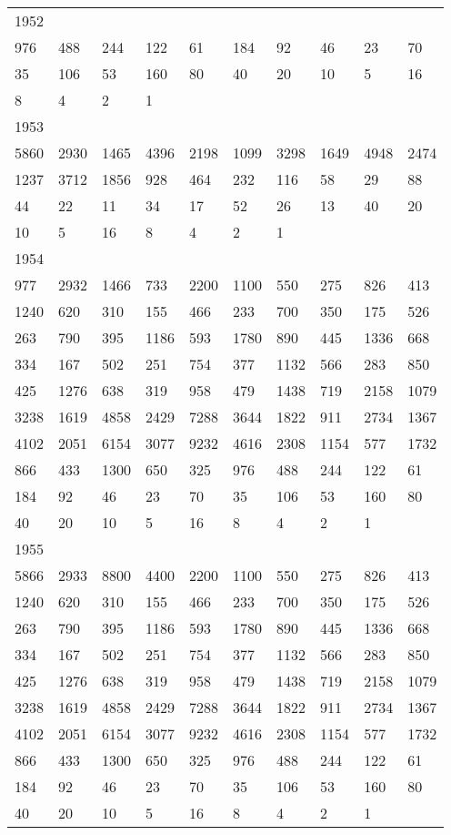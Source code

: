 \begin{longtable}{*{10}{l}}
1952&&&&&&&&&\\
976& 488& 244& 122& 61& 184& 92& 46& 23& 70\\
35& 106& 53& 160& 80& 40& 20& 10& 5& 16\\
8& 4& 2& 1& \\

1953&&&&&&&&&\\
5860& 2930& 1465& 4396& 2198& 1099& 3298& 1649& 4948& 2474\\
1237& 3712& 1856& 928& 464& 232& 116& 58& 29& 88\\
44& 22& 11& 34& 17& 52& 26& 13& 40& 20\\
10& 5& 16& 8& 4& 2& 1& \\

1954&&&&&&&&&\\
977& 2932& 1466& 733& 2200& 1100& 550& 275& 826& 413\\
1240& 620& 310& 155& 466& 233& 700& 350& 175& 526\\
263& 790& 395& 1186& 593& 1780& 890& 445& 1336& 668\\
334& 167& 502& 251& 754& 377& 1132& 566& 283& 850\\
425& 1276& 638& 319& 958& 479& 1438& 719& 2158& 1079\\
3238& 1619& 4858& 2429& 7288& 3644& 1822& 911& 2734& 1367\\
4102& 2051& 6154& 3077& 9232& 4616& 2308& 1154& 577& 1732\\
866& 433& 1300& 650& 325& 976& 488& 244& 122& 61\\
184& 92& 46& 23& 70& 35& 106& 53& 160& 80\\
40& 20& 10& 5& 16& 8& 4& 2& 1& \\

1955&&&&&&&&&\\
5866& 2933& 8800& 4400& 2200& 1100& 550& 275& 826& 413\\
1240& 620& 310& 155& 466& 233& 700& 350& 175& 526\\
263& 790& 395& 1186& 593& 1780& 890& 445& 1336& 668\\
334& 167& 502& 251& 754& 377& 1132& 566& 283& 850\\
425& 1276& 638& 319& 958& 479& 1438& 719& 2158& 1079\\
3238& 1619& 4858& 2429& 7288& 3644& 1822& 911& 2734& 1367\\
4102& 2051& 6154& 3077& 9232& 4616& 2308& 1154& 577& 1732\\
866& 433& 1300& 650& 325& 976& 488& 244& 122& 61\\
184& 92& 46& 23& 70& 35& 106& 53& 160& 80\\
40& 20& 10& 5& 16& 8& 4& 2& 1& \\


\end{longtable}

